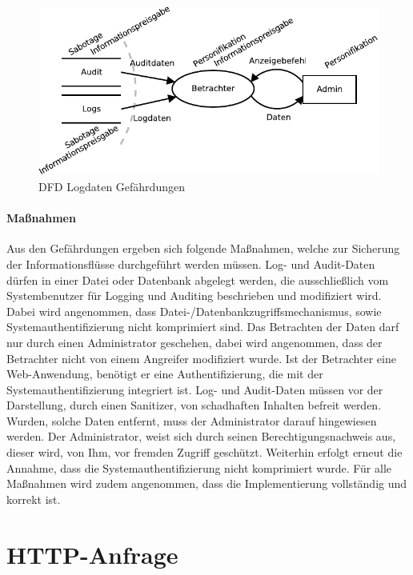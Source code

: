 \documentclass[11pt,a4paper]{report}
\begin{document}
\begin{figure}[htbp]
\centering
\includegraphics[scale=1.2]{images/dfd_logs_threats.pdf}
\caption{DFD Logdaten Gefährdungen}
\label{fig:dfd_logs_threat}
\end{figure}

\paragraph{Maßnahmen}

Aus den Gefährdungen ergeben sich folgende Maßnahmen, welche zur Sicherung der Informationsflüsse durchgeführt werden müssen. Log- und Audit-Daten dürfen in einer Datei oder Datenbank abgelegt werden, die ausschließlich vom Systembenutzer für Logging und Auditing beschrieben und modifiziert wird. Dabei wird angenommen, dass Datei-/Datenbankzugriffsmechanismus, sowie Systemauthentifizierung nicht komprimiert sind. Das Betrachten der Daten darf nur durch einen Administrator geschehen, dabei wird angenommen, dass der Betrachter nicht von einem Angreifer modifiziert wurde. Ist der Betrachter eine Web-Anwendung, benötigt er eine Authentifizierung, die mit der Systemauthentifizierung integriert ist. Log- und Audit-Daten müssen vor der Darstellung, durch einen Sanitizer, von schadhaften Inhalten befreit werden. Wurden, solche Daten entfernt, muss der Administrator darauf hingewiesen werden. Der Administrator, weist sich durch seinen Berechtigungsnachweis aus, dieser wird, von Ihm, vor fremden Zugriff geschützt. Weiterhin erfolgt erneut die Annahme, dass die Systemauthentifizierung nicht komprimiert wurde. Für alle Maßnahmen wird zudem angenommen, dass die Implementierung vollständig und korrekt ist.

\section{HTTP-Anfrage}
\end{document}
